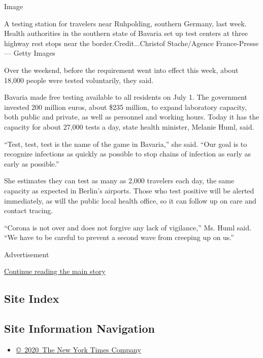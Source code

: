 Image

A testing station for travelers near Ruhpolding, southern Germany, last
week. Health authorities in the southern state of Bavaria set up test
centers at three highway rest stops near the border.Credit...Christof
Stache/Agence France-Presse --- Getty Images

Over the weekend, before the requirement went into effect this week,
about 18,000 people were tested voluntarily, they said.

Bavaria made free testing available to all residents on July 1. The
government invested 200 million euros, about \$235 million, to expand
laboratory capacity, both public and private, as well as personnel and
working hours. Today it has the capacity for about 27,000 tests a day,
state health minister, Melanie Huml, said.

``Test, test, test is the name of the game in Bavaria,'' she said. ``Our
goal is to recognize infections as quickly as possible to stop chains of
infection as early as early as possible.''

She estimates they can test as many as 2,000 travelers each day, the
same capacity as expected in Berlin's airports. Those who test positive
will be alerted immediately, as will the public local health office, so
it can follow up on care and contact tracing.

``Corona is not over and does not forgive any lack of vigilance,'' Ms.
Huml said. ``We have to be careful to prevent a second wave from
creeping up on us.''

Advertisement

\protect\hyperlink{after-bottom}{Continue reading the main story}

\hypertarget{site-index}{%
\subsection{Site Index}\label{site-index}}

\hypertarget{site-information-navigation}{%
\subsection{Site Information
Navigation}\label{site-information-navigation}}

\begin{itemize}
\tightlist
\item
  \href{https://help.nytimes.com/hc/en-us/articles/115014792127-Copyright-notice}{©~2020~The
  New York Times Company}
\end{itemize}

